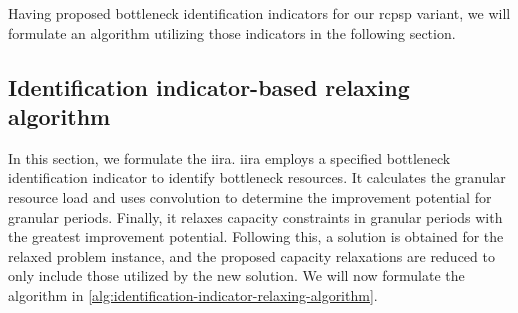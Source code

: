 Having proposed bottleneck identification indicators for our \ac{rcpsp} variant,
we will formulate an algorithm utilizing those indicators in the following section.

\subsection{Identification indicator-based relaxing algorithm}

In this section, we formulate the \acf{iira}.
\ac{iira} employs a specified bottleneck identification indicator to identify bottleneck resources.
It calculates the granular resource load
and uses convolution to determine the improvement potential for granular periods.
Finally, it relaxes capacity constraints in granular periods with the greatest improvement potential.
Following this, a solution is obtained for the relaxed problem instance,
and the proposed capacity relaxations are reduced to only include those utilized by the new solution.
We will now formulate the algorithm in \cref{alg:identification-indicator-relaxing-algorithm}.


